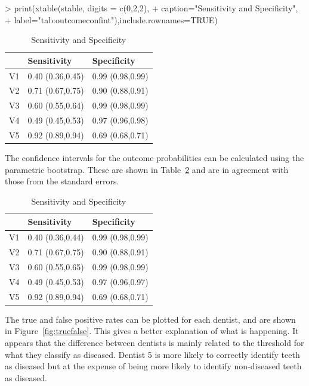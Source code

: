 \begin{Schunk}
\begin{Sinput}
> print(xtable(stable, digits = c(0,2,2),
+ 	caption="Sensitivity and Specificity",
+ 	label="tab:outcomeconfint"),include.rownames=TRUE)
\end{Sinput}
\begin{table}[ht]
\centering
\begin{tabular}{rll}
  \hline
 & Sensitivity & Specificity \\ 
  \hline
V1 & 0.40 (0.36,0.45) & 0.99 (0.98,0.99) \\ 
  V2 & 0.71 (0.67,0.75) & 0.90 (0.88,0.91) \\ 
  V3 & 0.60 (0.55,0.64) & 0.99 (0.98,0.99) \\ 
  V4 & 0.49 (0.45,0.53) & 0.97 (0.96,0.98) \\ 
  V5 & 0.92 (0.89,0.94) & 0.69 (0.68,0.71) \\ 
   \hline
\end{tabular}
\caption{Sensitivity and Specificity} 
\label{tab:outcomeconfint}
\end{table}\end{Schunk}


The confidence intervals for the outcome probabilities can be calculated using the parametric bootstrap. These are shown in Table~\ref{tab:outcomeconfintboot} and are in agreement with those from the standard errors.



\begin{table}[ht]
\centering
\begin{tabular}{rll}
  \hline
 & Sensitivity & Specificity \\ 
  \hline
V1 & 0.40 (0.36,0.44) & 0.99 (0.98,0.99) \\ 
  V2 & 0.71 (0.67,0.75) & 0.90 (0.88,0.91) \\ 
  V3 & 0.60 (0.55,0.65) & 0.99 (0.98,0.99) \\ 
  V4 & 0.49 (0.45,0.53) & 0.97 (0.96,0.97) \\ 
  V5 & 0.92 (0.89,0.94) & 0.69 (0.68,0.71) \\ 
   \hline
\end{tabular}
\caption{Sensitivity and Specificity} 
\label{tab:outcomeconfintboot}
\end{table}

The true and false positive rates can be plotted for each dentist, and are shown in Figure~\ref{fig:truefalse}. This gives a better explanation of what is happening. It appears that the difference between dentists is mainly related to the threshold for what they classify as diseased. Dentist 5 is more likely to correctly identify teeth as diseased but at the expense of being more likely to identify non-diseased teeth as diseased.

